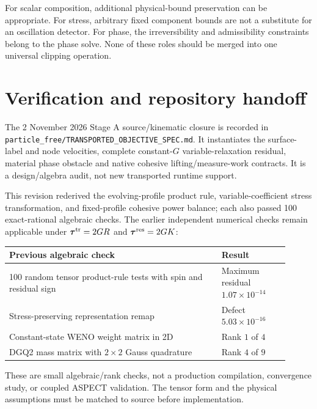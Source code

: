 \documentclass[10pt,letterpaper]{article}
\newcommand{\tat}{\bm\tau^{\rm tr}}
\newcommand{\tar}{\bm\tau^{\rm res}}
\begin{document}
For scalar composition, additional physical-bound preservation can be appropriate. For stress, arbitrary fixed component bounds are not a substitute for an oscillation detector. For phase, the irreversibility and admissibility constraints belong to the phase solve. None of these roles should be merged into one universal clipping operation.

\clearpage
\section{Verification and repository handoff}
The 2 November 2026 Stage A source/kinematic closure is recorded in
\texttt{particle\_free/TRANSPORTED\_OBJECTIVE\_SPEC.md}. It instantiates the
surface-label and node velocities, complete constant-$G$ variable-relaxation
residual, material phase obstacle and native cohesive lifting/measure-work
contracts. It is a design/algebra audit, not new transported runtime support.

This revision rederived the evolving-profile product rule, variable-coefficient stress transformation, and fixed-profile cohesive power balance; each also passed 100 exact-rational algebraic checks. The earlier independent numerical checks remain applicable under $\tat=2GR$ and $\tar=2GK$:
\begin{center}
\begin{tabular}{p{0.69\linewidth}p{0.22\linewidth}}
\toprule
Previous algebraic check & Result\\
\midrule
100 random tensor product-rule tests with spin and residual sign & Maximum residual $1.07\times10^{-14}$\\
Stress-preserving representation remap & Defect $5.03\times10^{-16}$\\
Constant-state WENO weight matrix in 2D & Rank $1$ of $4$\\
DGQ2 mass matrix with $2\times2$ Gauss quadrature & Rank $4$ of $9$\\
\bottomrule
\end{tabular}
\end{center}
These are small algebraic/rank checks, not a production compilation, convergence study, or coupled ASPECT validation. The tensor form and the physical assumptions must be matched to source before implementation.
\end{document}
